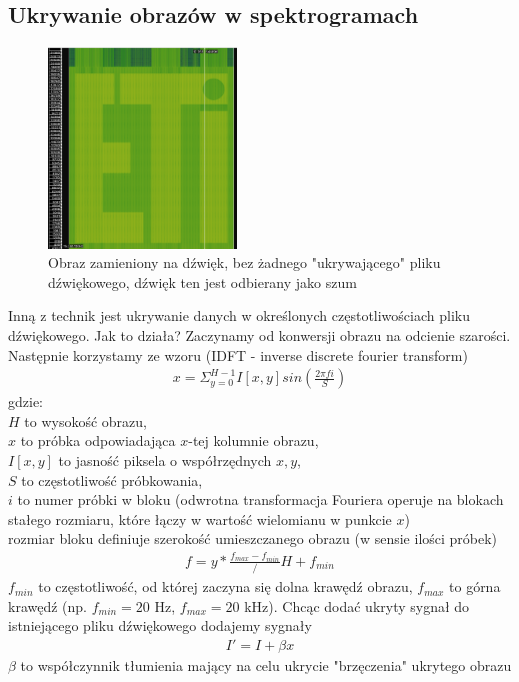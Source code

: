 \documentclass{article}
\begin{document}
\subsection{Ukrywanie obrazów w spektrogramach}
\begin{figure}[H]
	\centering
	\includegraphics[width=5cm]{samobraz}
	\caption{Obraz zamieniony na dźwięk, bez żadnego "ukrywającego" pliku dźwiękowego, dźwięk
	ten jest odbierany jako szum}
\end{figure}
Inną z technik jest ukrywanie danych w określonych częstotliwościach pliku dźwiękowego.
Jak to działa? Zaczynamy od konwersji obrazu na odcienie szarości.
Następnie korzystamy ze wzoru (IDFT - inverse discrete fourier transform)
\begin{gather*}
	x = \Sigma_{y=0}^{H-1}I[x,y]sin(\frac{2\pi f i}{S})
\end{gather*}
gdzie: \\ 
$H$ to wysokość obrazu, \\
$x$ to próbka odpowiadająca $x$-tej kolumnie obrazu,\\
$I[x,y]$ to jasność piksela o współrzędnych $x,y$, \\
$S$ to częstotliwość próbkowania, \\
$i$ to numer próbki w bloku (odwrotna transformacja Fouriera operuje na blokach stałego rozmiaru,
które łączy w wartość wielomianu w punkcie $x$) \\
rozmiar bloku definiuje szerokość umieszczanego obrazu (w sensie ilości próbek) 
\begin{gather*}
 f = y * \frac{f_{max} - f_{min}}/H + f_{min} 
\end{gather*}
 $f_{min}$ to częstotliwość, od której zaczyna
się dolna krawędź obrazu, $f_{max}$ to górna krawędź (np. $f_{min} = 20$ Hz, $f_{max} = 20$ kHz).
Chcąc dodać ukryty sygnał do istniejącego pliku dźwiękowego dodajemy sygnały
\begin{gather*}
I' = I + \beta x
\end{gather*}
$\beta$ to współczynnik tłumienia mający na celu ukrycie "brzęczenia" ukrytego obrazu
\end{document}
